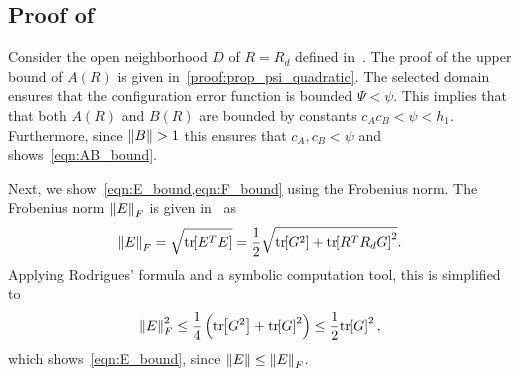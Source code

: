 	
\subsection{Proof of~}\label{proof:eR_dot_bound}

Consider the open neighborhood $D$ of $R=R_d$ defined in~.
The proof of the upper bound of \( A(R) \) is given in~\cref{proof:prop_psi_quadratic}.
The selected domain ensures that the configuration error function is bounded \( \Psi < \psi \).
This implies that that both \( A(R) \) and \( B(R) \) are bounded by constants \( c_A c_B < \psi < h_1\).
Furthermore, since \( \left\| B \right\| > 1 \) this ensures that \( c_A, c_B < \psi\) and shows~\cref{eqn:AB_bound}.

Next, we show~\cref{eqn:E_bound,eqn:F_bound} using the Frobenius norm.
The Frobenius norm \( \left\| E \right\|_F \) is given in~\cite{lee2013b} as
\begin{gather*}
	\left\| E \right\|_F = \sqrt{\mathrm{tr}\negthickspace\left[ E^T E \right]} = \frac{1}{2} \sqrt{\mathrm{tr}\negthickspace\left[ G^2 \right] + \mathrm{tr}\negthickspace\left[ R^T R_d G \right]^2}.
\end{gather*}
Applying Rodrigues' formula and a symbolic computation tool, this is simplified to
\begin{gather*}
	\left\| E \right\|^2_F \leq \frac{1}{4} \left( \mathrm{tr}\negthickspace\left[ G^2 \right] + \mathrm{tr}\negthickspace\left[ G \right]^2 \right) \leq \frac{1}{2} \mathrm{tr}\negthickspace\left[ G \right]^2 ,
\end{gather*}
which shows~\cref{eqn:E_bound}, since \( \left\| E \right\| \leq \left\| E \right\|_F \).

